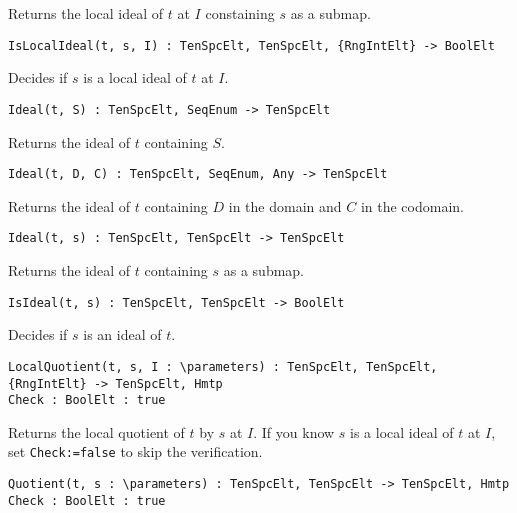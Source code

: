 \documentclass{amsart}
\begin{document}
Returns the local ideal of $t$ at $I$ constaining $s$ as a submap.


\color{blue}
{\small \begin{verbatim}
IsLocalIdeal(t, s, I) : TenSpcElt, TenSpcElt, {RngIntElt} -> BoolElt
\end{verbatim} }
\color{black}

Decides if $s$ is a local ideal of $t$ at $I$.

\color{blue}
{\small \begin{verbatim}
Ideal(t, S) : TenSpcElt, SeqEnum -> TenSpcElt
\end{verbatim} }
\color{black}

Returns the ideal of $t$ containing $S$.

\color{blue}
{\small \begin{verbatim}
Ideal(t, D, C) : TenSpcElt, SeqEnum, Any -> TenSpcElt
\end{verbatim} }
\color{black}

Returns the ideal of $t$ containing $D$ in the domain and $C$ in the codomain.

\color{blue}
{\small \begin{verbatim}
Ideal(t, s) : TenSpcElt, TenSpcElt -> TenSpcElt
\end{verbatim} }
\color{black}

Returns the ideal of $t$ containing $s$ as a submap.

\color{blue}
{\small \begin{verbatim}
IsIdeal(t, s) : TenSpcElt, TenSpcElt -> BoolElt
\end{verbatim} }
\color{black}

Decides if $s$ is an ideal of $t$.

\color{blue}
{\small \begin{verbatim}
LocalQuotient(t, s, I : \parameters) : TenSpcElt, TenSpcElt, {RngIntElt} -> TenSpcElt, Hmtp
Check : BoolElt : true
\end{verbatim} }
\color{black}

Returns the local quotient of $t$ by $s$ at $I$. If you know $s$ is a local 
ideal of $t$ at $I$, set {\tt Check:=false} to skip the verification.

\color{blue}
{\small \begin{verbatim}
Quotient(t, s : \parameters) : TenSpcElt, TenSpcElt -> TenSpcElt, Hmtp
Check : BoolElt : true
\end{verbatim} }
\color{black}
\end{document}
